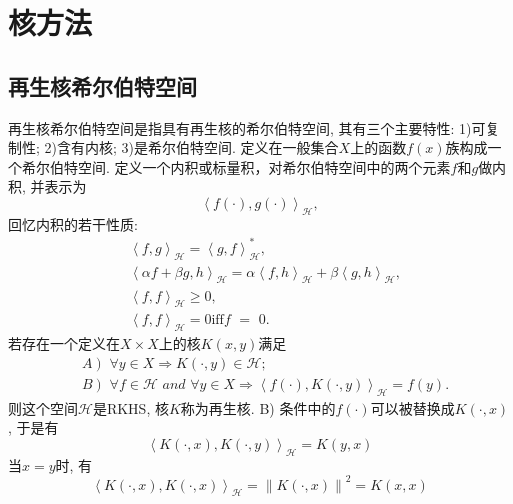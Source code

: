 \documentclass[lang=cn,10pt]{gorgeousnbook}
\numberwithin{equation}{section}%
\numberwithin{figure}{section}%
\begin{document}
\chapter{核方法}
\section{再生核希尔伯特空间}
再生核希尔伯特空间是指具有再生核的希尔伯特空间, 其有三个主要特性: 1)可复制性; 2)含有内核; 3)是希尔伯特空间. 
定义在一般集合$X$上的函数$f(x)$族构成一个希尔伯特空间. 定义一个内积或标量积，对希尔伯特空间中的两个元素$f$和$g$做内积, 并表示为
\begin{equation}
\left< f\left( \cdot \right) ,g\left( \cdot \right) \right> _{\mathcal{H}},
\end{equation}
回忆内积的若干性质:
\begin{equation}
\begin{aligned}
& \left< f,g \right> _{\mathcal{H}}=\left< g,f \right> _{\mathcal{H}}^{*},\\
& \left< \alpha f+\beta g,h \right> _{\mathcal{H}}=\alpha \left< f,h \right> _{\mathcal{H}}+\beta \left< g,h \right> _{\mathcal{H}},\\
& \left< f,f \right> _{\mathcal{H}}\geqslant 0,\\
& \left< f,f \right> _{\mathcal{H}}=0 \mathrm{iff} f\,\,=\,\,0.
\end{aligned}
\end{equation}
若存在一个定义在$X\times X$上的核$K(x,y)$满足
\begin{equation}
\begin{aligned}
& \left. A \right) \,\,\forall y\in X\Rightarrow K\left( \cdot ,y \right) \in \mathcal{H} ; \\
& \left. B \right) \,\,\forall f\in \mathcal{H} \,\,and\,\,\forall y\in X\Rightarrow \left< f\left( \cdot \right) ,K\left( \cdot ,y \right) \right> _{\mathcal{H}}=f\left( y \right) .
\end{aligned}
\end{equation}
则这个空间$\mathcal{H}$是RKHS, 核$K$称为再生核. B) 条件中的$f(\cdot)$可以被替换成$ K\left( \cdot ,x \right)$, 于是有
\begin{equation}
\left< K\left( \cdot ,x \right) ,K\left( \cdot ,y \right) \right> _{\mathcal{H}}=K\left( y,x \right) 
\end{equation}
当$x=y$时, 有
\begin{equation}
\left< K\left( \cdot ,x \right) ,K\left( \cdot ,x \right) \right> _{\mathcal{H}}=\left\| K\left( \cdot ,x \right) \right\| ^2=K\left( x,x \right) 
\end{equation}
\end{document}
